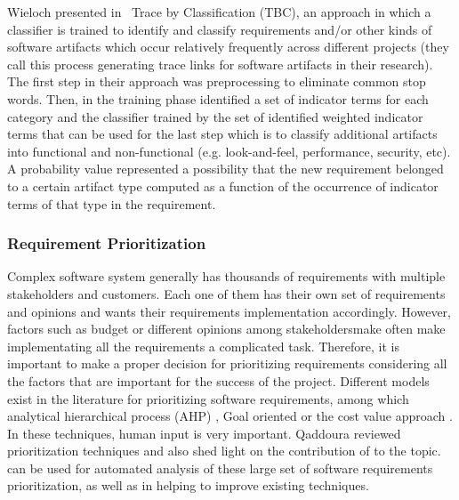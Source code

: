 Wieloch \etal presented in~\cite{Wieloch:2013} Trace by Classification (TBC), an
\ML approach in which a classifier is trained to identify and classify requirements
and/or other kinds of software artifacts which occur relatively frequently
across different projects (they call this process generating trace links for
software artifacts in their research).
The first step in their approach was preprocessing to eliminate common stop
words. Then, in the training phase identified a set of indicator
terms for each \NFR category and the classifier trained by the
set of identified weighted indicator terms that can be used for the last step
which is to classify additional artifacts into functional and non-functional
(e.g. look-and-feel, performance, security, etc). A probability value
represented a possibility that the new requirement belonged to a certain
artifact type computed as a function of the occurrence of indicator terms of
that type in the requirement. 
 

\subsubsection{Requirement Prioritization}
Complex software system generally has thousands of requirements with multiple
stakeholders and customers. Each one of them has their own set of requirements
and opinions and wants their requirements implementation accordingly. However,
factors such as budget or different opinions among stakeholdersmake often make
implementating all the requirements a complicated task. Therefore, it is
important to make a proper decision for prioritizing requirements considering
all the factors that are important for the success of the project. Different
models exist in the literature for prioritizing software requirements, among
which analytical hierarchical process (AHP) \cite{saaty2008}, Goal oriented
\cite{VanLamsweerde:2001} or the cost value approach \cite{Karlsson:1997}. In
these techniques, human input is very important. Qaddoura \etal
\cite{R.Qaddoura} reviewed  prioritization techniques and also shed light on the
contribution of \ML to the topic. \ML can be used for automated analysis of
these large set of software requirements prioritization, as well as in helping
to improve existing techniques.

